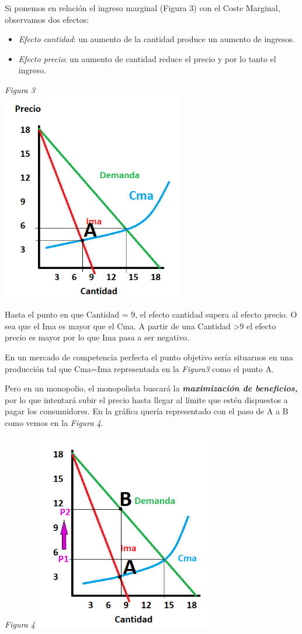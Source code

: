 \documentclass[
]{article}
\providecommand{\tightlist}{%
  \setlength{\itemsep}{0pt}\setlength{\parskip}{0pt}}
\begin{document}
Si ponemos en relación el ingreso marginal (Figura 3) con el Coste
Marginal, observamos dos efectos:

\begin{itemize}
\tightlist
\item
  \emph{Efecto cantidad}: un aumento de la cantidad produce un aumento
  de ingresos.
\item
  \emph{Efecto precio}: un aumento de cantidad reduce el precio y por lo
  tanto el ingreso.
\end{itemize}

\emph{Figura 3}\\
\includegraphics[width=3.125in,height=\textheight]{png/Figura3.png}

Hasta el punto en que Cantidad = 9, el efecto cantidad supera al efecto
precio. O sea que el Ima es mayor que el Cma. A partir de una Cantidad
\textgreater9 el efecto precio es mayor por lo que Ima pasa a ser
negativo.

En un mercado de competencia perfecta el punto objetivo sería situarnos
en una producción tal que Cma=Ima representada en la \emph{Figura3} como
el punto A.

Pero en un monopolio, el monopolista buscará la
\textbf{\emph{maximización de beneficios,}} por lo que intentará subir
el precio hasta llegar al límite que estén dispuestos a pagar los
consumidores. En la gráfica quería representado con el paso de A a B
como vemos en la \emph{Figura 4}.

\emph{Figura 4}
\includegraphics[width=3.125in,height=\textheight]{png/Figura4.png}
\end{document}
